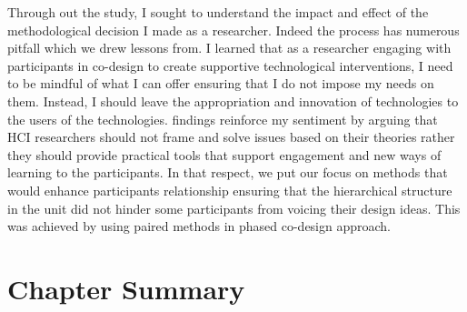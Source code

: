 Through out the study, I sought to understand the impact and effect of the methodological decision I made as a researcher. Indeed the process has numerous pitfall which we drew lessons from. I learned that as a researcher engaging with participants in co-design to create supportive technological interventions, I need to be mindful of what I can offer ensuring that I do not impose my needs on them. Instead, I should leave the appropriation and innovation of technologies to the users of the technologies. \textcite{Taylor2011} findings reinforce my sentiment by arguing that HCI researchers should not frame and solve issues based on their theories rather they should provide practical tools that support engagement and new ways of learning to the participants. In that respect, we put our focus on methods that would enhance participants relationship ensuring that the hierarchical structure in the unit did not hinder some participants from voicing their design ideas. This was achieved by using paired methods in phased co-design approach. 

\section{Chapter Summary}





